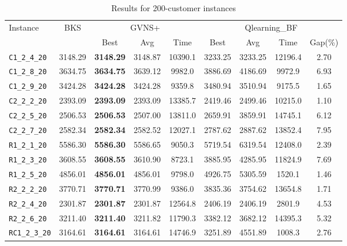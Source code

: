 \begin{table}[ht]
\centering
\small
\setlength{\tabcolsep}{5pt}
\caption{Results for 200-customer instances}
\vspace{4mm}
\begin{adjustbox}{width=\textwidth}
\begin{tabular}{l c c c c @{\hspace{8pt}} c c c c @{\hspace{8pt}}}
\toprule
\multirow{2}{*}{Instance} & \multirow{2}{*}{BKS} & \multicolumn{3}{c}{GVNS+} & \multicolumn{4}{c}{Qlearning\_BF} \\
\cmidrule(lr){3-5} \cmidrule(lr){6-9}
 &  & Best & Avg & Time & Best & Avg & Time & Gap(\%) \\
\midrule
\texttt{C1\_2\_4\_20} & 3148.29 & \textbf{3148.29} & 3148.87 & 10390.1 & 3233.25 & 3233.25 & 12196.4 & 2.70 \\
\texttt{C1\_2\_8\_20} & 3634.75 & \textbf{3634.75} & 3639.12 & 9982.0 & 3886.69 & 4186.69 & 9972.9 & 6.93 \\
\texttt{C1\_2\_9\_20} & 3424.28 & \textbf{3424.28} & 3424.28 & 9359.8 & 3480.94 & 3510.94 & 9175.5 & 1.65 \\
\texttt{C2\_2\_2\_20} & 2393.09 & \textbf{2393.09} & 2393.09 & 13385.7 & 2419.46 & 2499.46 & 10215.0 & 1.10 \\
\texttt{C2\_2\_5\_20} & 2506.53 & \textbf{2506.53} & 2507.00 & 13811.0 & 2659.91 & 3859.91 & 14745.1 & 6.12 \\
\texttt{C2\_2\_7\_20} & 2582.34 & \textbf{2582.34} & 2582.52 & 12027.1 & 2787.62 & 2887.62 & 13852.4 & 7.95 \\
\texttt{R1\_2\_1\_20} & 5586.30 & \textbf{5586.30} & 5586.65 & 9050.3 & 5719.54 & 6319.54 & 12408.0 & 2.39 \\
\texttt{R1\_2\_3\_20} & 3608.55 & \textbf{3608.55} & 3610.90 & 8723.1 & 3885.95 & 4285.95 & 11824.9 & 7.69 \\
\texttt{R1\_2\_5\_20} & 4856.01 & \textbf{4856.01} & 4856.01 & 9798.0 & 4926.75 & 5305.59 & 1520.1 & 1.46 \\
\texttt{R2\_2\_2\_20} & 3770.71 & \textbf{3770.71} & 3770.99 & 9386.0 & 3835.36 & 3754.62 & 13654.8 & 1.71 \\
\texttt{R2\_2\_4\_20} & 2301.87 & \textbf{2301.87} & 2301.87 & 12564.8 & 2406.19 & 2406.19 & 2801.9 & 4.53 \\
\texttt{R2\_2\_6\_20} & 3211.40 & \textbf{3211.40} & 3211.82 & 11790.3 & 3382.12 & 3682.12 & 14395.3 & 5.32 \\
\texttt{RC1\_2\_3\_20} & 3164.61 & \textbf{3164.61} & 3164.61 & 14746.9 & 3251.89 & 4551.89 & 1008.3 & 2.76 \\

\end{tabular}
\end{adjustbox}
\end{table}

